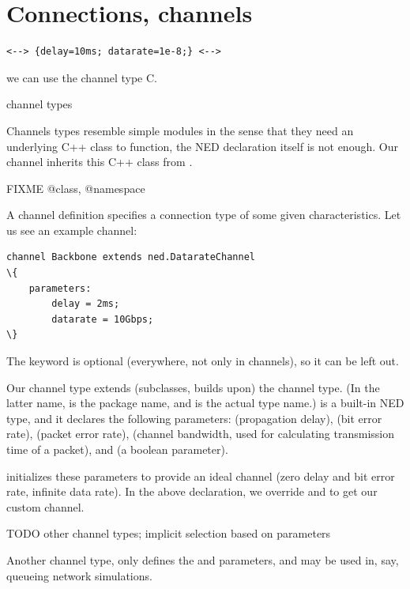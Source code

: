\section{Connections, channels}

\begin{Verbatim}
<--> {delay=10ms; datarate=1e-8;} <-->
\end{Verbatim}

we can use the channel type C.

channel types

Channels types resemble simple modules in the sense that they need an underlying
C++ class to function, the NED declaration itself is not enough. Our
 channel inherits this C++ class from .

FIXME @class, @namespace

A channel definition specifies a connection type of some given characteristics.
Let us see an example channel:

\begin{Verbatim}[commandchars=\\\{\}]
channel Backbone extends ned.DatarateChannel
\{
    parameters:
        delay = 2ms;
        datarate = 10Gbps;
\}
\end{Verbatim}

\begin{note}
    The  keyword is optional (everywhere, not only in
    channels), so it can be left out.
\end{note}

Our  channel type extends (subclasses, builds upon) the
 channel type. (In the latter name,  is the
package name, and  is the actual type name.)
 is a built-in NED type, and it declares the
following parameters:  (propagation delay),  (bit error rate),
 (packet error rate),  (channel bandwidth, used for
calculating transmission time of a packet), and  (a boolean parameter).

 initializes these parameters to provide an ideal channel
(zero delay and bit error rate, infinite data rate). In the above
declaration, we override  and  to get our custom
channel.

TODO other channel types; implicit selection based on parameters

Another channel type,  only defines the 
and  parameters, and may be used in, say, queueing
network simulations.


